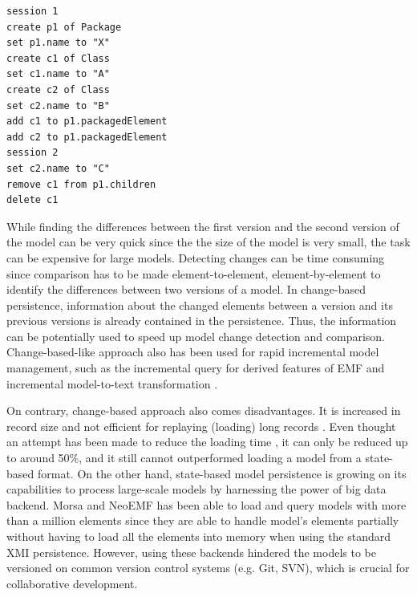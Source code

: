 \documentclass[10pt,conference]{IEEEtran}
\begin{document}
\begin{lstlisting}[style=eol,caption={The text change-based persistence of both versions in List. \ref{lst:xmimodel1} and \ref{lst:xmimodel2}.},label=lst:cbpmodel]
session 1
create p1 of Package
set p1.name to "X"  
create c1 of Class
set c1.name to "A"
create c2 of Class
set c2.name to "B"
add c1 to p1.packagedElement   
add c2 to p1.packagedElement
session 2
set c2.name to "C"
remove c1 from p1.children   
delete c1
\end{lstlisting}

While finding the differences between the first version and the second version of the model can be very quick since the the size of the model is very small, the task can be expensive for large models. Detecting changes can be time consuming since comparison has to be made element-to-element, element-by-element to identify the differences between two versions of a model. In change-based persistence, information about the changed elements between a version and its previous versions is already contained in the persistence. Thus, the information can be potentially used to speed up model change detection and comparison. Change-based-like approach also has been used for rapid incremental model management, such as the incremental query for derived features of EMF \cite{DBLP:conf/ecmdafa/RathHV12} and incremental model-to-text transformation \cite{DBLP:conf/ecmdafa/OgunyomiRK15}.

On contrary, change-based approach also comes disadvantages. It is increased in record size \cite{DBLP:journals/entcs/RobbesL07,DBLP:conf/edoc/KoegelHLHD10} and not efficient for replaying (loading)  long records \cite{mens2002state}. Even thought an attempt has been made to reduce the loading time \cite{yohannis2018towards}, it can only be reduced up to around 50\%, and it still cannot outperformed loading a model from a state-based format. On the other hand, state-based model persistence is growing on its capabilities to process large-scale models by harnessing the power of big data backend. Morsa \cite{DBLP:conf/models/Espinazo-PaganCM11} and NeoEMF \cite{daniel2016neoemf} has been able to load and query models with more than a million elements since they are able to handle model's elements partially without having to load all the elements into memory when using the standard XMI persistence. However, using these backends hindered the models to be versioned on common version control systems (e.g. Git, SVN), which is crucial for collaborative development.
\end{document}
